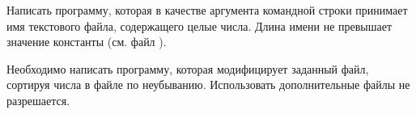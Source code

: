 
Написать программу, которая в качестве аргумента командной строки
принимает имя текстового файла, содержащего целые числа. Длина имени
не превышает значение константы  (см. файл ).

Необходимо написать программу, которая модифицирует заданный файл,
сортируя числа в файле по неубыванию. Использовать дополнительные
файлы не разрешается.
